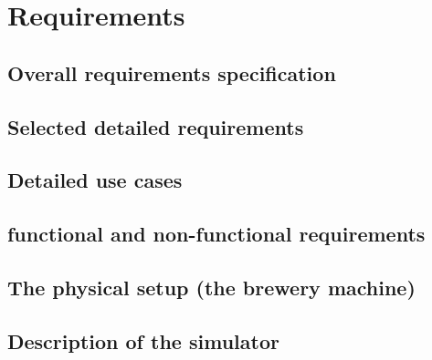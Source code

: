 \section{Requirements}

\subsection{Overall requirements specification}

\subsection{Selected detailed requirements}

\subsection{Detailed use cases}

\subsection{functional and non-functional requirements}

\subsection{The physical setup (the brewery machine)}

\subsection{Description of the simulator}
